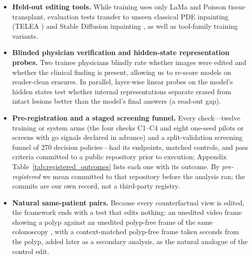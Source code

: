 \documentclass[5p,times,twocolumn,authoryear]{elsarticle}
\begin{document}
\begin{itemize}[leftmargin=*,nosep]
    \item \textbf{Held-out editing tools.} While training uses only LaMa and Poisson tissue transplant, evaluation tests transfer to unseen classical PDE inpainting (TELEA \citep{telea2004image}) and Stable Diffusion inpainting \citep{rombach2022high}, as well as tool-family training variants.
    \item \textbf{Blinded physician verification and hidden-state representation probes.} Two trainee physicians blindly rate whether images were edited and whether the clinical finding is present, allowing us to re-score models on reader-clean erasures. In parallel, layer-wise linear probes \citep{alain2016understanding} on the model's hidden states test whether internal representations separate erased from intact lesions better than the model's final answers (a read-out gap).
    \item \textbf{Pre-registration and a staged screening funnel.} Every check---twelve training or system arms (the four checks C1--C4 and eight one-seed pilots or screens with go signals declared in advance) and a split-validation screening funnel of 270 decision policies---had its endpoints, matched controls, and pass criteria committed to a public repository prior to execution; Appendix Table~\ref{tab:registered_outcomes} lists each one with its outcome. By \emph{pre-registered} we mean committed to that repository before the analysis ran; the commits are our own record, not a third-party registry.
    \item \textbf{Natural same-patient pairs.} Because every counterfactual view is edited, the framework ends with a test that edits nothing: an unedited video frame showing a polyp against an unedited polyp-free frame of the same colonoscopy \citep{biffi2024realcolon}, with a context-matched polyp-free frame taken seconds from the polyp, added later as a secondary analysis, as the natural analogue of the control edit.
\end{itemize}
\end{document}
